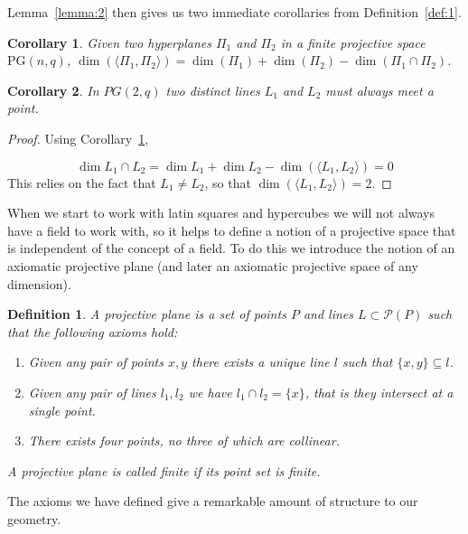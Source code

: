 \documentclass{article}
\newtheorem{corollary}{Corollary}
\newtheorem{definition}{Definition}
\newcommand{\PG}{\mathrm{PG}}
\begin{document}
Lemma~\ref{lemma:2} then gives us two immediate corollaries from Definition~\ref{def:1}.
\begin{corollary}\label{cor:1}
  Given two hyperplanes \(\Pi_1\) and \(\Pi_2\) in a finite projective space \(\PG(n, q)\), \(\dim(\langle \Pi_1, \Pi_2 \rangle) = \dim (\Pi_1) + \dim (\Pi_2) - \dim (\Pi_1 \cap \Pi_2)\).
\end{corollary}

\begin{corollary}
  In \(PG(2, q)\) two distinct lines \(L_1\) and \(L_2\) must always meet a point.
\end{corollary}
\begin{proof}
  Using Corollary~\ref{cor:1},

  \begin{equation*}
    \dim L_1 \cap L_2 = \dim L_1 + \dim L_2 - \dim (\langle L_1, L_2 \rangle) = 0
  \end{equation*}
  This relies on the fact that \(L_1 \neq L_2\), so that \(\dim (\langle L_1, L_2 \rangle) = 2\).
\end{proof}

When we start to work with latin squares and hypercubes we will not always have a field to work with, so it helps to define a notion of a projective space that is independent of the concept of a field. To do this we introduce the notion of an axiomatic projective plane (and later an axiomatic projective space of any dimension).

\begin{definition}
  A \textit{projective plane} is a set of points \(P\) and lines \(L \subset \mathcal{P}(P)\) such that the following axioms hold:

  \begin{enumerate}
    \item Given any pair of points \(x, y\) there exists a unique line \(l\) such that \(\{x, y\} \subseteq l\).\label{axiom:1}
    \item Given any pair of lines \(l_1, l_2\) we have \(l_1 \cap l_2 = \{x\}\), that is they intersect at a single point.\label{axiom:2}
    \item There exists four points, no three of which are collinear.\label{axiom:3}
  \end{enumerate}

  A projective plane is called finite if its point set is finite.
\end{definition}


The axioms we have defined give a remarkable amount of structure to our geometry.
\end{document}
